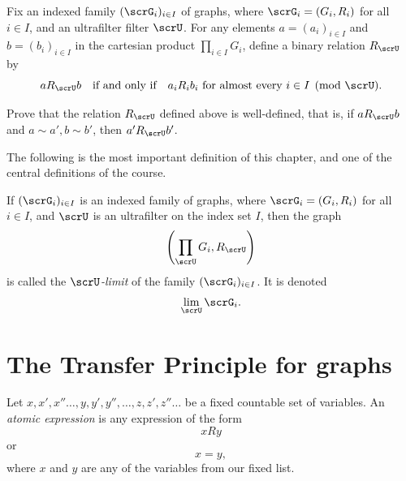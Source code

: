 Fix an indexed  family $(\scrG_i)_{i\in I}$  of graphs, where $\scrG_i=(G_i,R_i)$ for all $i\in I$, and an  ultrafilter filter $\scrU$.
For any elements $a= (a_i)_{i\in I}$ and $b= (b_i)_{i\in I}$ in the cartesian product $\prod_{i\in I} G_i$, define a binary relation $R_{\scrU}$ by
\[
  a R_{\scrU} b
  \quad\text{if and only if}\quad
  \text{$a_i R_i b_i$ for almost every $i\in I \pmod{\scrU}$.}
\]

\begin{exercise}
  Prove that the relation $R_{\scrU}$ defined above  is well-defined, that is, if $a R_{\scrU} b$ and $a\sim a', b\sim b'$, then $a' R_{\scrU} b'$.
\end{exercise}

The following is the most important definition of this chapter, and one of the central definitions of the course.

\begin{definition}
  \label{def:ultraproduct-of-graphs}
  If $(\scrG_i)_{i\in I}$ is an indexed family of graphs, where $\scrG_i=(G_i,R_i)$ for all $i\in I$, and $\scrU$ is an ultrafilter on the index set $I$, then the graph
  \[
    \left(\prod_{\scrU}G_i, R_{\scrU}\right)
  \]
  is called the  \emph{$\scrU$-limit}  of the family $(\scrG_i)_{i\in I}$.
  It is denoted
  \[
    \lim_{\scrU} \scrG_i.
  \]
\end{definition}

\section{The Transfer Principle for graphs}

Let $x, x', x''\dots, y, y', y'',\dots, z, z', z''\dots$ be a fixed countable set of variables.
An \emph{atomic expression} is any expression of the form
\[
  xRy
\]
or
\[
  x=y,
\]
where $x$ and $y$ are any of the variables from our fixed list.

